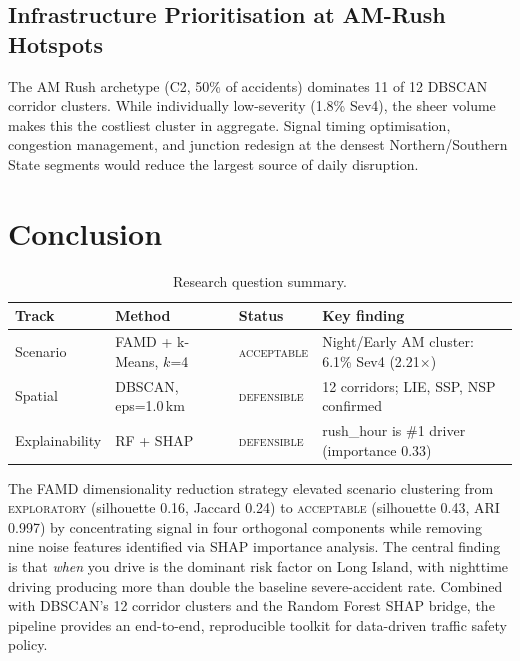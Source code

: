 \documentclass[11pt,letterpaper]{article}
\begin{document}
\subsection{Infrastructure Prioritisation at AM-Rush Hotspots}

The AM Rush archetype (C2, 50\% of accidents) dominates 11 of 12 DBSCAN corridor clusters. While individually low-severity (1.8\% Sev4), the sheer volume makes this the costliest cluster in aggregate. Signal timing optimisation, congestion management, and junction redesign at the densest Northern/Southern State segments would reduce the largest source of daily disruption.

\section{Conclusion}

\begin{table}[H]
\centering
\caption{Research question summary.}
\begin{tabular}{@{}llll@{}}
\toprule
\textbf{Track} & \textbf{Method} & \textbf{Status} & \textbf{Key finding} \\
\midrule
Scenario & FAMD + k-Means, $k$=4 & \textsc{acceptable} & Night/Early AM cluster: 6.1\% Sev4 (2.21$\times$) \\
Spatial  & DBSCAN, eps=1.0\,km & \textsc{defensible} & 12 corridors; LIE, SSP, NSP confirmed \\
Explainability & RF + SHAP & \textsc{defensible} & rush\_hour is \#1 driver (importance 0.33) \\
\bottomrule
\end{tabular}
\end{table}

The FAMD dimensionality reduction strategy elevated scenario clustering from \textsc{exploratory} (silhouette 0.16, Jaccard 0.24) to \textsc{acceptable} (silhouette 0.43, ARI 0.997) by concentrating signal in four orthogonal components while removing nine noise features identified via SHAP importance analysis.
The central finding is that \emph{when} you drive is the dominant risk factor on Long Island, with nighttime driving producing more than double the baseline severe-accident rate.
Combined with DBSCAN's 12 corridor clusters and the Random Forest SHAP bridge, the pipeline provides an end-to-end, reproducible toolkit for data-driven traffic safety policy.
\end{document}
